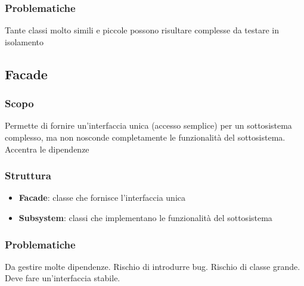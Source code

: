 \subsubsection{Problematiche}
Tante classi molto simili e piccole possono risultare complesse da testare in
isolamento

\subsection{Facade}
\subsubsection{Scopo}
Permette di fornire un'interfaccia unica (accesso semplice) per un sottosistema complesso, ma non
nosconde completamente le funzionalità del sottosistema. Accentra le dipendenze
\subsubsection{Struttura}
\begin{itemize}
    \item \textbf{Facade}: classe che fornisce l'interfaccia unica
    \item \textbf{Subsystem}: classi che implementano le funzionalità del sottosistema
\end{itemize}
\subsubsection{Problematiche}
Da gestire molte dipendenze. Rischio di introdurre bug. Rischio di classe grande. Deve fare un'interfaccia stabile. 
